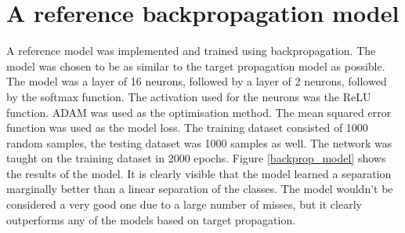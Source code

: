 \section{A reference backpropagation model}
A reference model was implemented and trained using backpropagation. The model was chosen to be as similar to the target propagation model as possible. The model was a layer of 16 neurons, followed by a layer of 2 neurons, followed by the softmax function. The activation used for the neurons was the ReLU function. ADAM was used as the optimisation method. The mean squared error function was used as the model loss. The training dataset consisted of 1000 random samples, the testing dataset was 1000 samples as well. The network was taught on the training dataset in 2000 epochs. Figure \ref{backprop_model} shows the results of the model. It is clearly visible that the model learned a separation marginally better than a linear separation of the classes. The model wouldn't be considered a very good one due to a large number of misses, but it clearly outperforms any of the models based on target propagation.

